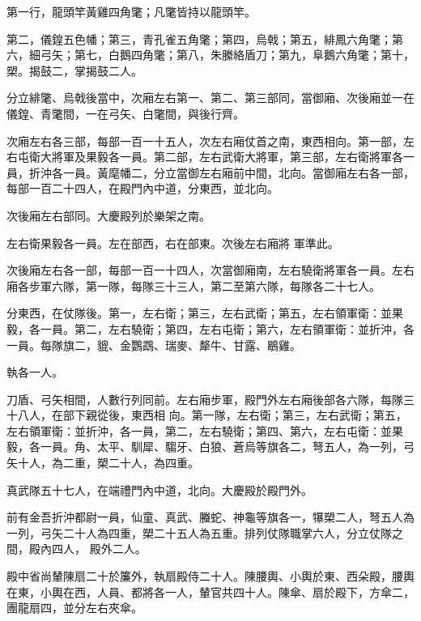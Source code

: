 \begin{pinyinscope}
 第一行，龍頭竿黃雞四角氅；凡氅皆持以龍頭竿。



 第二，儀鍠五色幡；第三，青孔雀五角氅；第四，烏戟；第五，緋鳳六角氅；第六，細弓矢；第七，白鵝四角氅；第八，朱縢絡盾刀；第九，阜鵝六角氅；第十，
 槊。揭鼓二，掌揭鼓二人。



 分立緋氅、烏戟後當中，次廂左右第一、第二、第三部同，當御廂、次後廂並一在儀鍠、青氅間，一在弓矢、白氅間，與後行齊。



 次廂左右各三部，每部一百一十五人，次左右廂仗首之南，東西相向。第一部，左右屯衛大將軍及果毅各一員。第二部，左右武衛大將軍，第三部，左右衛將軍各一員，折沖各一員。黃麾幡二，分立當御左右廂前中間，北向。當御廂左右各一部，每部一百二十四人，在殿門內中道，分東西，並北向。



 次後廂左右部同。大慶殿列於樂架之南。



 左右衛果毅各一員。左在部西，右在部東。次後左右廂將
 軍準此。



 次後廂左右各一部，每部一百一十四人，次當御廂南，左右驍衛將軍各一員。左右廂各步軍六隊，第一隊，每隊三十三人，第二至第六隊，每隊各二十七人。



 分東西，在仗隊後。第一，左右衛；第三，左右武衛；第五，左右領軍衛：並果毅，各一員。第二，左右驍衛；第四，左右屯衛；第六，左右領軍衛：並折沖，各一員。每隊旗二，貔、金鸚鵡、瑞麥、犛牛、甘露、鶡雞。



 執各一人。



 刀盾、弓矢相間，人數行列同前。左右廂步軍，殿門外左右廂後部各六隊，每隊三十八人，在部下親從後，東西相
 向。第一隊，左右衛；第三，左右武衛；第五，左右領軍衛：並折沖，各一員，第二，左右驍衛；第四、第六，左右屯衛：並果毅，各一員。角、太平、馴犀、騶牙、白狼、蒼烏等旗各二，弩五人，為一列，弓矢十人，為二重，槊二十人，為四重。



 真武隊五十七人，在端禮門內中道，北向。大慶殿於殿門外。



 前有金吾折沖都尉一員，仙童、真武、螣蛇、神龜等旗各一，犦槊二人，弩五人為一列，弓矢二十人為四重，槊二十五人為五重。排列仗隊職掌六人，分立仗隊之間，殿內四人，
 殿外二人。



 殿中省尚輦陳扇二十於簾外，執扇殿侍二十人。陳腰輿、小輿於東、西朵殿，腰輿在東，小輿在西，人員、都將各一人，輦官共四十人。陳傘、扇於殿下，方傘二，團龍扇四，並分左右夾傘。




\end{pinyinscope}
